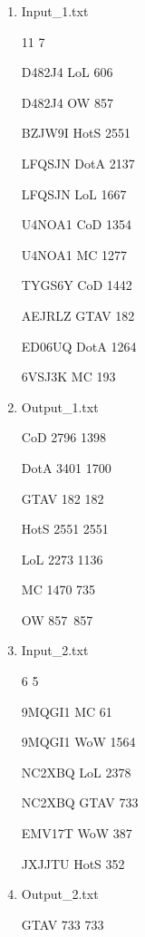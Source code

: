 \documentclass[10pt]{article}
\begin{document}
\begin{enumerate}
	\item Input\_1.txt
	\begin{center}
		{\raggedright
			11 7
		}
		
		{\raggedright
			D482J4 LoL 606
		}
		
		{\raggedright
			D482J4 OW 857
		}
		
		{\raggedright
			BZJW9I HotS 2551
		}
		
		{\raggedright
			LFQSJN DotA 2137
		}
		
		{\raggedright
			LFQSJN LoL 1667
		}
		
		{\raggedright
			U4NOA1 CoD 1354
		}
		
		{\raggedright
			U4NOA1 MC 1277
		}
		
		{\raggedright
			TYGS6Y CoD 1442
		}
		
		{\raggedright
			AEJRLZ GTAV 182
		}
		
		{\raggedright
			ED06UQ DotA 1264
		}
		
		{\raggedright
			6VSJ3K MC 193
		}
	\end{center}

	\item Output\_1.txt
	\begin{center}
{\raggedright
CoD 2796 1398
}

{\raggedright
DotA 3401 1700
}

{\raggedright
GTAV 182 182
}

{\raggedright
HotS 2551 2551
}

{\raggedright
LoL 2273 1136
}

{\raggedright
MC 1470 735
}

{\raggedright
OW 857~857
}
	\end{center}

	\item Input\_2.txt
\begin{center}

{\raggedright
6 5
}

{\raggedright
9MQGI1 MC 61
}

{\raggedright
9MQGI1 WoW 1564
}

{\raggedright
NC2XBQ LoL 2378
}

{\raggedright
NC2XBQ GTAV 733
}

{\raggedright
EMV17T WoW 387
}

{\raggedright
JXJJTU HotS 352
}
	\end{center}

	\item Output\_2.txt
	\begin{center}
{\raggedright
GTAV 733 733
}


\end{center}
\end{enumerate}
\end{document}
